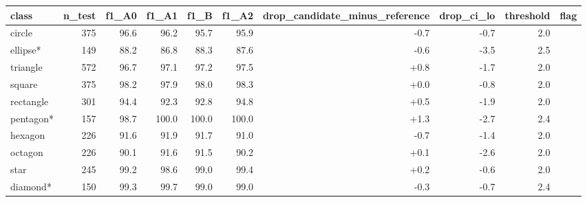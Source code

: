\begin{tabular}{lrrrrrrrrr}
\toprule
class & n\_test & f1\_A0 & f1\_A1 & f1\_B & f1\_A2 & drop\_candidate\_minus\_reference & drop\_ci\_lo & threshold & flag \\
\midrule
circle & 375 & 96.6 & 96.2 & 95.7 & 95.9 & -0.7 & -0.7 & 2.0 &  \\
ellipse* & 149 & 88.2 & 86.8 & 88.3 & 87.6 & -0.6 & -3.5 & 2.5 &  \\
triangle & 572 & 96.7 & 97.1 & 97.2 & 97.5 & +0.8 & -1.7 & 2.0 &  \\
square & 375 & 98.2 & 97.9 & 98.0 & 98.3 & +0.0 & -0.8 & 2.0 &  \\
rectangle & 301 & 94.4 & 92.3 & 92.8 & 94.8 & +0.5 & -1.9 & 2.0 &  \\
pentagon* & 157 & 98.7 & 100.0 & 100.0 & 100.0 & +1.3 & -2.7 & 2.4 &  \\
hexagon & 226 & 91.6 & 91.9 & 91.7 & 91.0 & -0.7 & -1.4 & 2.0 &  \\
octagon & 226 & 90.1 & 91.6 & 91.5 & 90.2 & +0.1 & -2.6 & 2.0 &  \\
star & 245 & 99.2 & 98.6 & 99.0 & 99.4 & +0.2 & -0.6 & 2.0 &  \\
diamond* & 150 & 99.3 & 99.7 & 99.0 & 99.0 & -0.3 & -0.7 & 2.4 &  \\
\bottomrule
\end{tabular}
